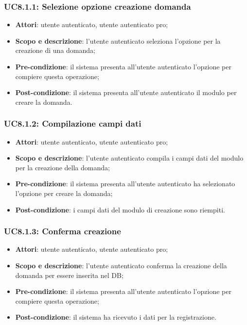 	\subsubsection{UC8.1.1: Selezione opzione creazione domanda}
	\begin{itemize}
		\item
			\textbf{Attori}: utente autenticato, utente autenticato pro;
		\item
			\textbf{Scopo e descrizione}: l'utente autenticato seleziona l'opzione per la creazione di una domanda;
		\item		
			\textbf{Pre-condizione}: il sistema presenta all'utente autenticato l'opzione per compiere questa operazione;
		\item
			\textbf{Post-condizione}: il sistema presenta all'utente autenticato il modulo per creare la domanda.
	\end{itemize}	
	\subsubsection{UC8.1.2: Compilazione campi dati}
	\begin{itemize}
		\item
			\textbf{Attori}: utente autenticato, utente autenticato pro;
		\item
			\textbf{Scopo e descrizione}: l'utente autenticato compila i campi dati del modulo per la creazione della domanda;
		\item		
			\textbf{Pre-condizione}: il sistema presenta all'utente autenticato ha selezionato l'opzione per creare la domanda;
		\item
			\textbf{Post-condizione}: i campi dati del modulo di creazione sono riempiti.
	\end{itemize}	
	\subsubsection{UC8.1.3: Conferma creazione}
	\begin{itemize}
		\item
			\textbf{Attori}: utente autenticato, utente autenticato pro;
		\item
			\textbf{Scopo e descrizione}: l'utente autenticato conferma la creazione della domanda per essere inserita nel DB;
		\item		
			\textbf{Pre-condizione}: il sistema presenta all'utente autenticato l'opzione per compiere questa operazione;
		\item
			\textbf{Post-condizione}: il sistema ha ricevuto i dati per la registrazione.
	\end{itemize}	
